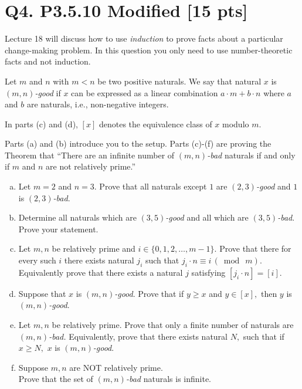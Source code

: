 \documentclass[12pt]{article}
\begin{document}
	\newpage
	\section*{\textbf{Q4. P3.5.10 Modified} [15 pts]}
	Lecture 18 will discuss how to use {\em induction} to prove facts about a particular
	change-making problem. In this question
	you only need to use number-theoretic facts and not induction.

	Let $m$ and $n$ with $m < n$ be two positive naturals. We say that natural $x$
	is {\em $(m,n)$-good} if $x$ can be expressed as a linear combination $a \cdot
	m + b \cdot n$ where $a$ and $b$ are naturals, i.e., non-negative integers.

	In parts (c) and (d), $[x]$ denotes the equivalence class of $x$ modulo $m.$

	Parts (a) and (b) introduce you to the setup. Parts (c)-(f) are proving the Theorem
	that ``There are an infinite number of {\em $(m,n)$-bad} naturals if and only if
	$m$ and $n$ are not relatively prime.''

	\begin{enumerate}[a)]
		\item Let $m = 2$ and $n = 3.$ Prove that all naturals except $1$ are {\em $(2,3)$-good}
			and $1$ is {\em $(2,3)$-bad}.

		\item Determine all naturals which are {\em $(3,5)$-good} and all which are {\em $(3,5)$-bad}.
			Prove your statement.

		\item Let $m,n$ be relatively prime and $i \in \{0,1,2,\ldots,m-1\}.$ Prove that
			there for every such $i$ there exists natural $j_{i}$ such that $j_{i} \cdot
			n \equiv i \, (\bmod \ m)$. \\
			Equivalently prove that there exists a natural $j$ satisfying
			$[j_{i} \cdot n]= [i]$.

		\item Suppose that $x$ is {\em $(m,n)$-good}. Prove that if $y \ge x$ and
			$y\in [x],$ then $y$ is {\em $(m,n)$-good}.

		\item Let $m,n$ be relatively prime. Prove that only a finite number of
			naturals are {\em $(m,n)$-bad.} Equivalently, prove that there exists natural
			$N,$ such that if $x \ge N,$ $x$ is {\em $(m,n)$-good}.

		\item Suppose $m,n$ are NOT relatively prime.\\
			Prove that the set of {\em $(m,n)$-bad} naturals is infinite.
	\end{enumerate}
\end{document}
